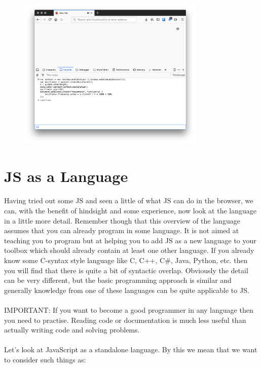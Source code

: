 \begin{figure}[H]
\centering
\includegraphics[width=0.8\textwidth]{figures/js-theremin}
\label{fig:js-theremin}
\caption{}
\end{figure}


\section{JS as a Language}
\paragraph{} Having tried out some JS and seen a little of what JS can do in the browser, we can, with the benefit of hindsight and some experience, now look at the language in a little more detail. Remember though that this overview of the language assumes that you can already program in some language. It is not aimed at teaching you to program but at helping you to add JS as a new language to your toolbox which should already contain at least one other language. If you already know some C-syntax style language like C, C++, C\#, Java, Python, etc. then you will find that there is quite a bit of syntactic overlap. Obviously the detail can be very different, but the basic programming approach is similar and generally knowledge from one of these languages can be quite applicable to JS.
\paragraph{} IMPORTANT: If you want to become a good programmer in any language then you need to practise. Reading code or documentation is much less useful than actually writing code and solving problems.
\paragraph{} Let's look at JavaScript as a standalone language. By this we mean that we want to consider such things as:

